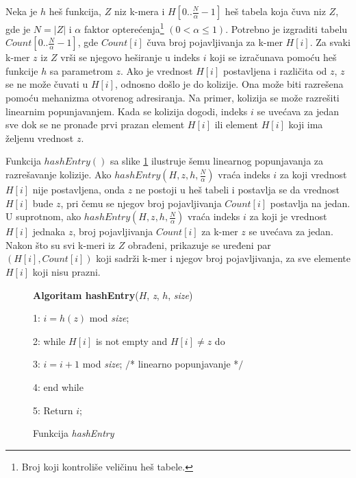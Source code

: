 \documentclass[12pt,oneside]{memoir}
\begin{document}
Neka je $h$ heš funkcija, $Z$ niz k-mera i $H[0..\frac{N}{\alpha} - 1]$ heš tabela koja čuva niz $Z$, gde je $N = |Z|$ i $\alpha$ faktor opterećenja\footnote{Broj koji kontroliše veličinu heš tabele.} $(0 < \alpha \leq 1)$. Potrebno je izgraditi tabelu $Count[0..\frac{N}{\alpha} - 1]$, gde $Count[i]$ čuva broj pojavljivanja za k-mer $H[i]$. Za svaki k-mer $z$ iz $Z$ vrši se njegovo heširanje u indeks $i$ koji se izračunava pomoću heš funkcije $h$ sa parametrom $z$. Ako je vrednost $H[i]$ postavljena i različita od $z$, $z$ se ne može čuvati u $H[i]$, odnosno došlo je do kolizije. Ona može biti razrešena pomoću mehanizma otvorenog adresiranja. Na primer, kolizija se može razrešiti linearnim popunjavanjem. Kada se kolizija dogodi, indeks $i$ se uvećava za jedan sve dok se ne pronađe prvi prazan element $H[i]$ ili element $H[i]$ koji ima željenu vrednost $z$.

\begin{comment}

\begin{figure}[!ht]
  \centering
  \texttt{[image: HashEntry.PNG]}
  \caption{Funkcija hashEntry \cite{WingKinSung}}
  \label{fig:hashEntry}
\end{figure}

\end{comment}

Funkcija $hashEntry()$ sa slike \ref{box:hashEntry} ilustruje šemu linearnog popunjavanja za razrešavanje kolizije. Ako $hashEntry(H, z, h, \frac{N}{\alpha})$ vraća indeks $i$ za koji vrednost $H[i]$ nije postavljena, onda $z$ ne postoji u heš tabeli i postavlja se da vrednost $H[i]$ bude $z$, pri čemu se njegov broj pojavljivanja $Count[i]$ postavlja na jedan. U suprotnom, ako $hashEntry(H, z, h, \frac{N}{\alpha})$ vraća indeks $i$ za koji je vrednost $H[i]$ jednaka $z$, broj pojavljivanja $Count[i]$ za k-mer $z$ se uvećava za jedan. Nakon što su svi k-meri iz $Z$ obrađeni, prikazuje se uređeni par $(H[i], Count[i])$ koji sadrži k-mer i njegov broj pojavljivanja, za sve elemente $H[i]$ koji nisu prazni.

\begin{figure}[!ht]
\begin{tcolorbox}
\textbf{Algoritam hashEntry}($H$, \textit{z}, $h$, \textit{size})

1: $i = h(z)$ mod \textit{size};

2: while $H[i]$ is not empty and $H[i] \neq z$ do

3:\hspace{1cm} $i = i + 1$ mod \textit{size}; $/$* linearno popunjavanje *$/$

4: end while

5: Return $i$;
\end{tcolorbox}
\caption{Funkcija \textit{hashEntry} \cite{WingKinSung}}
\label{box:hashEntry}
\end{figure}
\end{document}
